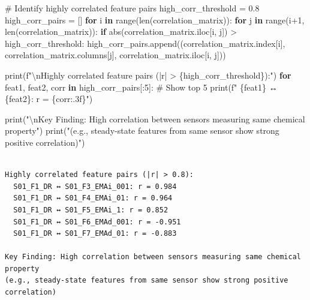 \documentclass[
  letterpaper,
  DIV=11,
  numbers=noendperiod]{scrartcl}
\newenvironment{Shaded}{\begin{snugshade}}{\end{snugshade}}
\newcommand{\BuiltInTok}[1]{\textcolor[rgb]{0.00,0.23,0.31}{#1}}
\newcommand{\CharTok}[1]{\textcolor[rgb]{0.13,0.47,0.30}{#1}}
\newcommand{\CommentTok}[1]{\textcolor[rgb]{0.37,0.37,0.37}{#1}}
\newcommand{\ControlFlowTok}[1]{\textcolor[rgb]{0.00,0.23,0.31}{\textbf{#1}}}
\newcommand{\DecValTok}[1]{\textcolor[rgb]{0.68,0.00,0.00}{#1}}
\newcommand{\FloatTok}[1]{\textcolor[rgb]{0.68,0.00,0.00}{#1}}
\newcommand{\KeywordTok}[1]{\textcolor[rgb]{0.00,0.23,0.31}{\textbf{#1}}}
\newcommand{\NormalTok}[1]{\textcolor[rgb]{0.00,0.23,0.31}{#1}}
\newcommand{\OperatorTok}[1]{\textcolor[rgb]{0.37,0.37,0.37}{#1}}
\newcommand{\SpecialCharTok}[1]{\textcolor[rgb]{0.37,0.37,0.37}{#1}}
\newcommand{\SpecialStringTok}[1]{\textcolor[rgb]{0.13,0.47,0.30}{#1}}
\newcommand{\StringTok}[1]{\textcolor[rgb]{0.13,0.47,0.30}{#1}}
\renewenvironment{Shaded}{%
  \begin{tcolorbox}[%
    enhanced,%
    colback=codebg,%
    colframe=codebg,%
    borderline west={3pt}{0pt}{sectionblue},%
    fontupper=\small\ttfamily,%
    boxrule=0pt,%
    arc=0pt,%
    boxsep=5pt,%
    left=2mm,%
    right=2mm,%
    top=2mm,%
    bottom=2mm%
  ]%
}{%
  \end{tcolorbox}%
}
\begin{document}
\begin{Shaded}
\begin{Highlighting}[]
\CommentTok{\# Identify highly correlated feature pairs}
\NormalTok{high\_corr\_threshold }\OperatorTok{=} \FloatTok{0.8}
\NormalTok{high\_corr\_pairs }\OperatorTok{=}\NormalTok{ []}
\ControlFlowTok{for}\NormalTok{ i }\KeywordTok{in} \BuiltInTok{range}\NormalTok{(}\BuiltInTok{len}\NormalTok{(correlation\_matrix)):}
    \ControlFlowTok{for}\NormalTok{ j }\KeywordTok{in} \BuiltInTok{range}\NormalTok{(i}\OperatorTok{+}\DecValTok{1}\NormalTok{, }\BuiltInTok{len}\NormalTok{(correlation\_matrix)):}
        \ControlFlowTok{if} \BuiltInTok{abs}\NormalTok{(correlation\_matrix.iloc[i, j]) }\OperatorTok{\textgreater{}}\NormalTok{ high\_corr\_threshold:}
\NormalTok{            high\_corr\_pairs.append((correlation\_matrix.index[i], }
\NormalTok{                                   correlation\_matrix.columns[j], }
\NormalTok{                                   correlation\_matrix.iloc[i, j]))}

\BuiltInTok{print}\NormalTok{(}\SpecialStringTok{f"}\CharTok{\textbackslash{}n}\SpecialStringTok{Highly correlated feature pairs (|r| \textgreater{} }\SpecialCharTok{\{}\NormalTok{high\_corr\_threshold}\SpecialCharTok{\}}\SpecialStringTok{):"}\NormalTok{)}
\ControlFlowTok{for}\NormalTok{ feat1, feat2, corr }\KeywordTok{in}\NormalTok{ high\_corr\_pairs[:}\DecValTok{5}\NormalTok{]:  }\CommentTok{\# Show top 5}
    \BuiltInTok{print}\NormalTok{(}\SpecialStringTok{f"  }\SpecialCharTok{\{}\NormalTok{feat1}\SpecialCharTok{\}}\SpecialStringTok{ ↔ }\SpecialCharTok{\{}\NormalTok{feat2}\SpecialCharTok{\}}\SpecialStringTok{: r = }\SpecialCharTok{\{}\NormalTok{corr}\SpecialCharTok{:.3f\}}\SpecialStringTok{"}\NormalTok{)}

\BuiltInTok{print}\NormalTok{(}\StringTok{"}\CharTok{\textbackslash{}n}\StringTok{Key Finding: High correlation between sensors measuring same chemical property"}\NormalTok{)}
\BuiltInTok{print}\NormalTok{(}\StringTok{"(e.g., steady{-}state features from same sensor show strong positive correlation)"}\NormalTok{)}
\end{Highlighting}
\end{Shaded}

\begin{verbatim}

Highly correlated feature pairs (|r| > 0.8):
  S01_F1_DR ↔ S01_F3_EMAi_001: r = 0.984
  S01_F1_DR ↔ S01_F4_EMAi_01: r = 0.964
  S01_F1_DR ↔ S01_F5_EMAi_1: r = 0.852
  S01_F1_DR ↔ S01_F6_EMAd_001: r = -0.951
  S01_F1_DR ↔ S01_F7_EMAd_01: r = -0.883

Key Finding: High correlation between sensors measuring same chemical property
(e.g., steady-state features from same sensor show strong positive correlation)
\end{verbatim}
\end{document}
